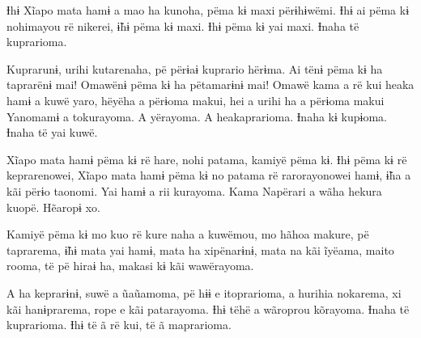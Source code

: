 Ɨhɨ Xĩapo mata hamɨ a mao ha kunoha, pëma kɨ maxi përɨhɨwëmi. Ɨhɨ ai
pëma kɨ nohimayou rë nikerei, ɨ̃hɨ pëma kɨ maxi. Ɨhɨ pëma kɨ yai maxi.
Ɨnaha të kuprarioma. 

Kuprarunɨ, urihi kutarenaha, pë përɨaɨ kuprario hërɨma. Ai tënɨ pëma kɨ
 ha taprarënɨ mai! Omawënɨ pëma kɨ ha pëtamarɨnɨ mai! Omawë kama a rë kui
 heaka hamɨ a kuwë yaro, hëyëha a përɨoma makui, hei a urihi ha a përɨoma
 makui Yanomamɨ a tokurayoma. A yërayoma. A heakaprarioma. Ɨnaha kɨ
 kupɨoma. Ɨnaha të yai kuwë. 

Xĩapo mata hamɨ pëma kɨ rë hare, nohi patama, kamiyë pëma kɨ. Ɨhɨ pëma
 kɨ rë keprarenowei, Xĩapo mata hamɨ pëma kɨ no patama rë rarorayonowei
 hamɨ, ɨ̃ha a kãi përɨo taonomi. Yai hamɨ a rii kurayoma. Kama Napërari a
 wãha hekura kuopë. Hẽaropɨ xo. 

Kamiyë pëma kɨ mo kuo rë kure naha a kuwëmou, mo hãhoa makure, pë
 taprarema, ɨ̃hɨ mata yai hamɨ, mata ha xipënarɨnɨ, mata na kãi ĩyëama,
 maito rooma, të pë hiraɨ ha, makasi kɨ kãi wawërayoma. 

A ha keprarɨnɨ, suwë a ũaũamoma, pë hɨɨ e itoprarioma, a hurihia
 nokarema, xi kãi hanɨprarema, rope e kãi patarayoma. Ɨhɨ tëhë a wãroprou
 kõrayoma. Ɨnaha të kuprarioma. Ɨhɨ të ã rë kui, të ã maprarioma.
